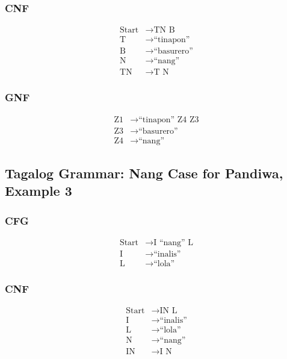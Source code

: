 \subsubsection{CNF}
\begin{equation*}
    \begin{aligned}
        \text{Start}   & \rightarrow \text{TN B}   \\
        \text{T} & \rightarrow \text{“tinapon”} \\
        \text{B} & \rightarrow \text{“basurero”} \\
        \text{N} & \rightarrow \text{“nang”} \\
        \text{TN} & \rightarrow \text{T N}
    \end{aligned}
\end{equation*}

\subsubsection{GNF}
\begin{equation*}
    \begin{aligned}
        \text{Z1}   & \rightarrow \text{“tinapon” Z4 Z3}   \\
        \text{Z3} & \rightarrow \text{“basurero”} \\
        \text{Z4} & \rightarrow \text{“nang”}
    \end{aligned}
\end{equation*}

\newpage
\subsection{Tagalog Grammar: Nang Case for Pandiwa, Example 3}
\subsubsection{CFG}
\begin{equation*}
    \begin{aligned}
        \text{Start}   & \rightarrow \text{I “nang” L}   \\
        \text{I} & \rightarrow \text{“inalis”} \\
        \text{L} & \rightarrow \text{“lola”}
    \end{aligned}
\end{equation*}

\subsubsection{CNF}
\begin{equation*}
    \begin{aligned}
        \text{Start}   & \rightarrow \text{IN L}   \\
        \text{I} & \rightarrow \text{“inalis”} \\
        \text{L} & \rightarrow \text{“lola”} \\
        \text{N} & \rightarrow \text{“nang”} \\
        \text{IN} & \rightarrow \text{I N}
    \end{aligned}
\end{equation*}

